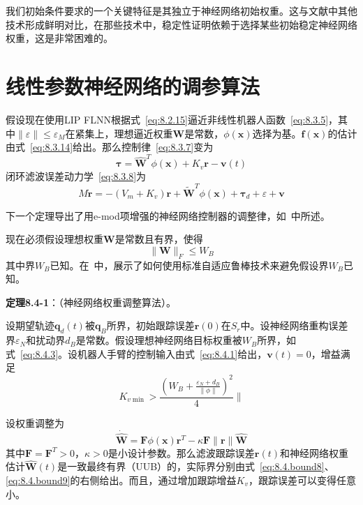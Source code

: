 \documentclass[12pt,a4paper]{ctexart}
\begin{document}
我们初始条件要求的一个关键特征是其独立于神经网络初始权重。这与文献中其他技术形成鲜明对比，在那些技术中，稳定性证明依赖于选择某些初始稳定神经网络权重，这是非常困难的。

\section{线性参数神经网络的调参算法}

假设现在使用LIP FLNN根据式~\eqref{eq:8.2.15}逼近非线性机器人函数~\eqref{eq:8.3.5}，其中$\|\varepsilon\| \leq \varepsilon_M$在紧集上，理想逼近权重$\bm{W}$是常数，$\phi(\bm{x})$选择为基。$\bm{f}(\bm{x})$的估计由式~\eqref{eq:8.3.14}给出。那么控制律~\eqref{eq:8.3.7}变为
\begin{equation}\label{eq:8.4.1}
\bm{\tau} = \hat{\bm{W}}^T \phi(\bm{x}) + K_v\bm{r} - \bm{v}(t)
\end{equation}
闭环滤波误差动力学~\eqref{eq:8.3.8}为
\begin{equation}\label{eq:8.4.2}
M\dot{\bm{r}} = -(V_m + K_v)\bm{r} + \tilde{\bm{W}}^T\phi(\bm{x}) + \bm{\tau}_d + \varepsilon + \bm{v}
\end{equation}

下一个定理导出了用e-mod项增强的神经网络控制器的调整律，如~\cite{narendra1987}中所述。

现在必须假设理想权重$\bm{W}$是常数且有界，使得
\begin{equation}\label{eq:8.4.3}
\|\bm{W}\|_F \leq W_B
\end{equation}
其中界$W_B$已知。在~\cite{polycarpou1996}中，展示了如何使用标准自适应鲁棒技术来避免假设界$W_B$已知。

\textbf{定理8.4-1}：（神经网络权重调整算法）。

设期望轨迹$\bm{q}_d(t)$被$\bm{q}_B$所界，初始跟踪误差$\bm{r}(0)$在$S_r$中。设神经网络重构误差界$\varepsilon_N$和扰动界$d_B$是常数。假设理想神经网络目标权重被$W_B$所界，如式~\eqref{eq:8.4.3}。设机器人手臂的控制输入由式~\eqref{eq:8.4.1}给出，$\bm{v}(t)=0$，增益满足
\begin{equation}\label{eq:8.4.cond1}
K_{v\min} > \frac{(W_B + \frac{\varepsilon_N + d_B}{\|\phi\|})^2}{4}\|
\end{equation}

设权重调整为
\begin{equation}\label{eq:8.4.cond2}
\dot{\hat{\bm{W}}} = \bm{F}\phi(\bm{x})\bm{r}^T - \kappa\bm{F}\|\bm{r}\|\hat{\bm{W}}
\end{equation}
其中$\bm{F}=\bm{F}^T>0$，$\kappa>0$是小设计参数。那么滤波跟踪误差$\bm{r}(t)$和神经网络权重估计$\hat{\bm{W}}(t)$是一致最终有界（UUB）的，实际界分别由式~\eqref{eq:8.4.bound8}、\eqref{eq:8.4.bound9}的右侧给出。而且，通过增加跟踪增益$K_v$，跟踪误差可以变得任意小。
\end{document}
